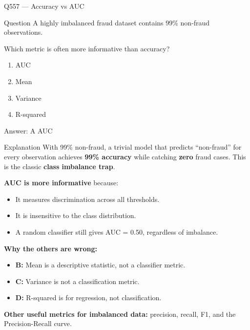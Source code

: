 \documentclass[aspectratio=169,8pt]{beamer}
\begin{document}
	\begin{frame}{Q557 --- Accuracy vs AUC}
		\begin{block}{Question}
			A highly imbalanced fraud dataset contains 99\% non-fraud observations.
			
			Which metric is often more informative than accuracy?
			\begin{enumerate}
				\item AUC
				\item Mean
				\item Variance
				\item R-squared
			\end{enumerate}
		\end{block}
		
		\begin{exampleblock}{Answer: A}
			AUC
		\end{exampleblock}
		
		\begin{block}{Explanation}
			With 99\% non-fraud, a trivial model that predicts ``non-fraud'' for every
			observation achieves \textbf{99\% accuracy} while catching \textbf{zero}
			fraud cases. This is the classic \textbf{class imbalance trap}.
			
			\textbf{AUC is more informative} because:
			\begin{itemize}
				\item It measures discrimination across all thresholds.
				\item It is insensitive to the class distribution.
				\item A random classifier still gives AUC = 0.50, regardless of imbalance.
			\end{itemize}
			
			\textbf{Why the others are wrong:}
			\begin{itemize}
				\item \textbf{B:} Mean is a descriptive statistic, not a classifier metric.
				\item \textbf{C:} Variance is not a classification metric.
				\item \textbf{D:} R-squared is for regression, not classification.
			\end{itemize}
			
			\textbf{Other useful metrics for imbalanced data:} precision, recall, F1,
			and the Precision-Recall curve.
		\end{block}
	\end{frame}
	
\end{document}
